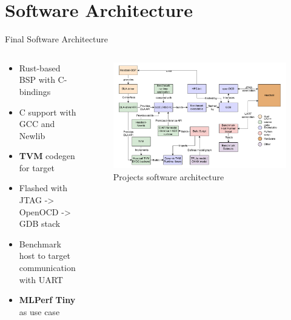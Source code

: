 \section{Software Architecture}
\begin{frame}{Final Software Architecture}
  \begin{columns}
    \begin{column}{0.3\textwidth}
      \begin{itemize}
        \item Rust-based BSP with C-bindings
        \item C support with GCC and Newlib
        \item \textbf{TVM} codegen for target
        \item Flashed with JTAG -> OpenOCD -> GDB stack
        \item Benchmark host to target communication with UART
        \item \textbf{MLPerf Tiny} as use case
      \end{itemize}
    \end{column}
    \begin{column}{0.7\textwidth}
        \begin{figure}
          \includegraphics[height=0.6\textheight]{../../thesis/img/dla-architecture-new.pdf}
          \caption{Projects software architecture}
        \end{figure}
      \end{column}
  \end{columns}
\end{frame}

